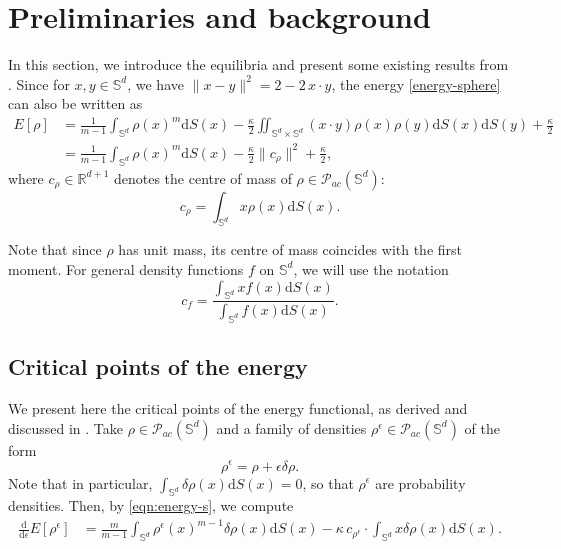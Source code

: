 \documentclass[11pt]{amsart}
\newcommand{\bbr}{\mathbb R}
\newcommand{\bbs}{\mathbb S}
\newcommand{\calP}{\mathcal{P}}
\def\d{\mathrm{d}}
\newcommand{\dx}{\mathrm{d}S (x)}
\newcommand{\dy}{\mathrm{d}S (y)}
\newcommand{\dm}{d} %
\begin{document}
\section{Preliminaries and background}
\label{sect:prelims}
In this section, we introduce the equilibria and present some existing results from \cite{FePaVa2025}. Since for $x,y \in \bbs^\dm$, we have $\| x-y \|^2 = 2 - 2 \, x\cdot y$, the energy \eqref{energy-sphere} can also be written as
\begin{equation}
\label{eqn:energy-s}
\begin{aligned}
E[\rho]&=\frac{1}{m-1}\int_{\bbs^\dm}\rho(x)^m\dx-\frac{\kappa}{2}\iint_{\bbs^\dm\times\bbs^\dm} (x \cdot y) \rho(x)\rho(y)\dx \dy+\frac{\kappa}{2} \\
&=\frac{1}{m-1}\int_{\bbs^\dm}\rho(x)^m\dx - \frac{\kappa}{2} \| c_\rho\|^2 +\frac{\kappa}{2},
\end{aligned}
\end{equation}
where $c_\rho \in \bbr^{\dm+1}$ denotes the centre of mass of $\rho \in \calP_{ac}(\bbs^\dm)$:
\begin{equation}
\label{eqn:CM}
c_\rho = \int_{\bbs^\dm} x\rho(x) \dx.
\end{equation}

Note that since $\rho$ has unit mass, its centre of mass coincides with the first moment. For general density functions $f$ on $\bbs^\dm$, we will use the notation
\begin{equation}
\label{eqn:CM-general}
c_f = \frac{\int_{\bbs^\dm} x f(x) \dx}{\int_{\bbs^\dm} f(x) \dx}.
\end{equation}


\subsection{Critical points of the energy} 
\label{subsect:cp} 
We present here the critical points of the energy functional, as derived and discussed in \cite{FePaVa2025}. Take $\rho \in \calP_{ac}(\bbs^\dm)$ and a family of densities  $\rho^\epsilon \in \calP_{ac}(\bbs^\dm)$
of the form
\[
\rho^\epsilon = \rho + \epsilon \delta \rho.
\]
Note that in particular, $\int_{\bbs^\dm} \delta \rho(x) \dx =0$, so that $\rho^\epsilon$ are probability densities. Then, by \eqref{eqn:energy-s}, we compute
\begin{align*}
  \frac{\d}{\d \epsilon} E[\rho^\epsilon] &= 
  \frac{m}{m-1} \int_{\bbs^\dm} \rho^\epsilon(x)^{m-1} \delta \rho(x) \dx -\kappa \,  c_{\rho^\epsilon} \cdot
  \int_{\bbs^\dm} x \delta \rho(x) \dx.
\end{align*}
\end{document}
